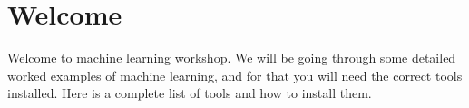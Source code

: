\section{Welcome}
\label{sec:welcome}
Welcome to machine learning workshop.
We will be going through some detailed worked examples of machine learning, and for that you will need the correct tools installed.
Here is a complete list of tools and how to install them.

